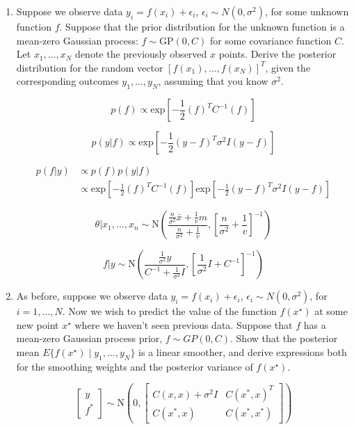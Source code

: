\documentclass[10pt]{article}
\begin{document}
        \begin{enumerate}[label=(\Alph*)]
            \item Suppose we observe data $y_i = f(x_i) + \epsilon_i$, $\epsilon_i \sim N(0, \sigma^2)$, for some unknown function $f$. Suppose that the prior distribution for the unknown function is a mean-zero Gaussian process: $f \sim \mbox{GP}(0, C)$ for some covariance function $C$.  Let $x_1, \ldots, x_N$ denote the previously observed $x$ points.  Derive the posterior distribution for the random vector $[f(x_1), \ldots, f(x_N)]^T$, given the corresponding outcomes $y_1, \ldots, y_N$, assuming that you know $\sigma^2$.

            $$p(f) \propto \text{exp}\left[ -\frac{1}{2}(f)^T C^{-1} (f)\right]$$

            $$p(y|f) \propto \text{exp}\left[ -\frac{1}{2}(y - f)^T \sigma^2 I (y-f)\right]$$

            \begin{align*}
            p(f|y) &\propto p(f) p(y|f) \\
                &\propto \text{exp}\left[ -\frac{1}{2}(f)^T C^{-1} (f)\right] \text{exp}\left[ -\frac{1}{2}(y - f)^T \sigma^2 I (y-f)\right] 
            \end{align*}

            $$\theta | x_1,...,x_n \sim \text{N} \left( \frac{\frac{n}{\sigma^2} \bar{x} + \frac{1}{v}m}{\frac{n}{\sigma^2} + \frac{1}{v}}, \left [ \frac{n}{\sigma^2} + \frac{1}{v}\right]^{-1} \right)$$

            $$f|y \sim \text{N} \left( \frac{\frac{1}{\sigma^2}y}{C^{-1} + \frac{1}{\sigma^2}I}, \left[ \frac{1}{\sigma^2}I + C^{-1}\right]^{-1}\right)$$

            \item As before, suppose we observe data $y_i = f(x_i) + \epsilon_i$, $\epsilon_i \sim N(0, \sigma^2)$, for $i=1, \ldots, N$.  Now we wish to predict the value of the function $f(x^{\star})$ at some new point $x^{\star}$ where we haven't seen previous data.  Suppose that $f$ has a mean-zero Gaussian process prior, $f \sim GP(0, C)$.  Show that the posterior mean $E\{ f(x^{\star}) \mid y_1, \ldots, y_N \}$ is a linear smoother, and derive expressions both for the smoothing weights and the posterior variance of $f(x^{\star})$.

            $$\begin{bmatrix} y \\ f^* \end{bmatrix} \sim \text{N} \left(0, \begin{bmatrix} C(x, x) + \sigma^2 I & C(x^*, x)^T \\ C(x^*, x) & C(x^*, x^*)\end{bmatrix} \right)$$


\end{enumerate}
\end{document}
